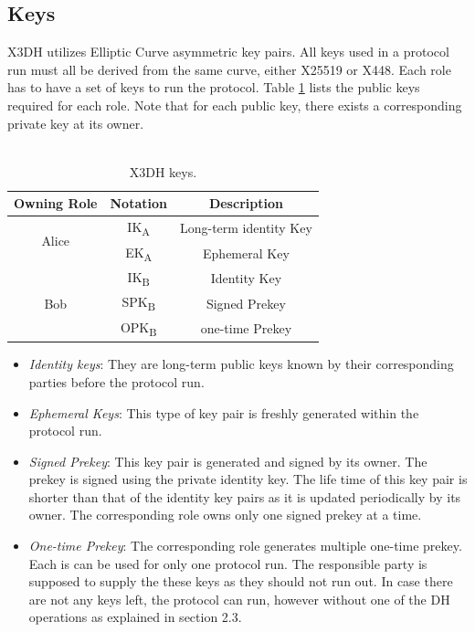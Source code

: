 \subsection{Keys}
X3DH utilizes Elliptic Curve asymmetric key pairs. All keys used in a protocol run must all be derived from the same curve, either X25519 or X448. Each role has to have a set of keys to run the protocol. Table \ref{tab:keys} lists the public keys required for each role. Note that for each public key, there exists a corresponding private key at its owner.\\\\
\begin{table}
	\centering
	\begin{tabular}{|c||c|c|}
		
		\hline
		Owning Role & Notation				 & Description 			  \\\hline
		\multirow{2}{*}{Alice} & IK\textsubscript{A} 	 & Long-term identity Key \\
		& EK\textsubscript{A} 	 & Ephemeral Key 		  \\\hline
		\multirow{3}{*}{Bob}  & IK\textsubscript{B} 	 & Identity Key 		  \\
		& SPK\textsubscript{B} 	 & Signed Prekey 		  \\
		& OPK\textsubscript{B} 	 & one-time Prekey 		  \\ \hline
		
	\end{tabular}
	\caption{X3DH keys.}
	\label{tab:keys}
\end{table}
\begin{itemize}
	\item \textit{Identity keys}: They are long-term public keys known by their corresponding parties before the protocol run.
	
	\item \textit{Ephemeral Keys}: This type of key pair is freshly generated within the protocol run.
	
	\item \textit{Signed Prekey}: This key pair is generated and signed by its owner. The prekey is signed using the private identity key. The life time of this key pair is shorter than that of the identity key pairs as it is updated periodically by its owner. The corresponding role owns only one signed prekey at a time.
	
	\item \textit{One-time Prekey}: The corresponding role generates multiple one-time prekey. Each is can be used for only one protocol run. The responsible party is supposed to supply the these keys as they should not run out. In case there are not any keys left, the protocol can run, however without one of the DH operations as explained in section 2.3.
\end{itemize}
